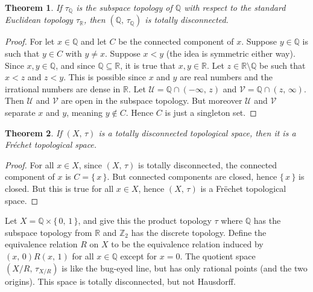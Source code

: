 \documentclass{article}
\theoremstyle{plain}
\newtheorem{theorem}{Theorem}[section]
\theoremstyle{normal}
\newenvironment{example}{%
    \pushQED{\qed}\renewcommand{\qedsymbol}{$\blacksquare$}\examplex%
}{%
    \popQED\endexamplex%
}
\begin{document}
        \begin{theorem}
            If $\tau_{\mathbb{Q}}$ is the subspace topology of $\mathbb{Q}$
            with respect to the standard Euclidean topology $\tau_{\mathbb{R}}$,
            then $(\mathbb{Q},\,\tau_{\mathbb{Q}})$ is totally disconnected.
        \end{theorem}
        \begin{proof}
            For let $x\in\mathbb{Q}$ and let $C$ be the connected component of
            $x$. Suppose $y\in\mathbb{Q}$ is such that $y\in{C}$ with $y\ne{x}$.
            Suppose $x<y$ (the idea is symmetric either way).
            Since $x,y\in\mathbb{Q}$, and since $\mathbb{Q}\subseteq\mathbb{R}$,
            it is true that $x,y\in\mathbb{R}$. Let
            $z\in\mathbb{R}\setminus\mathbb{Q}$ be such that $x<z$ and $z<y$.
            This is possible since $x$ and $y$ are real numbers and the
            irrational numbers are dense in $\mathbb{R}$. Let
            $\mathcal{U}=\mathbb{Q}\cap(-\infty,\,z)$ and
            $\mathcal{V}=\mathbb{Q}\cap(z,\,\infty)$. Then $\mathcal{U}$ and
            $\mathcal{V}$ are open in the subspace topology. But moreover
            $\mathcal{U}$ and $\mathcal{V}$ separate $x$ and $y$, meaning
            $y\notin{C}$. Hence $C$ is just a singleton set.
        \end{proof}
        \begin{theorem}
            If $(X,\,\tau)$ is a totally disconnected topological space, then
            it is a Fr\'{e}chet topological space.
        \end{theorem}
        \begin{proof}
            For all $x\in{X}$, since $(X,\,\tau)$ is totally disconnected, the
            connected component of $x$ is $C=\{\,x\,\}$. But connected
            components are closed, hence $\{\,x\,\}$ is closed. But this is true
            for all $x\in{X}$, hence $(X,\,\tau)$ is a Fr\"{e}chet topological
            space.
        \end{proof}
        \begin{example}[\textbf{The Rational Bug-Eyed Line}]
            Let $X=\mathbb{Q}\times\{\,0,\,1\,\}$, and give this the product
            topology $\tau$ where $\mathbb{Q}$ has the subspace topology from
            $\mathbb{R}$ and $\mathbb{Z}_{2}$ has the discrete topology. Define
            the equivalence relation $R$ on $X$ to be the equivalence relation
            induced by $(x,\,0)R(x,\,1)$ for all $x\in\mathbb{Q}$ except for
            $x=0$. The quotient space $(X/R,\,\tau_{X/R})$ is like the
            bug-eyed line, but has only rational points (and the two origins).
            This space is totally disconnected, but not Hausdorff.
        \end{example}
\end{document}
